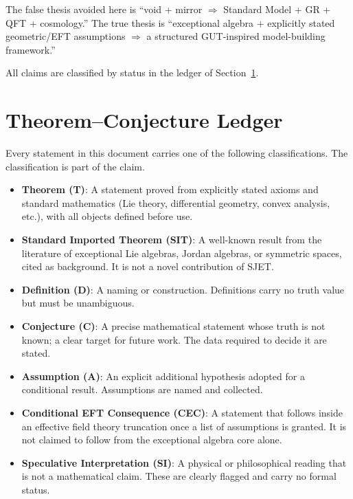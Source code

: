 \documentclass[11pt]{article}
\theoremstyle{plain}
\theoremstyle{definition}
\theoremstyle{remark}
\numberwithin{equation}{section}
\begin{document}
The false thesis avoided here is ``void + mirror $\Longrightarrow$ Standard Model + GR + QFT + cosmology.'' The true thesis is ``exceptional algebra + explicitly stated geometric/EFT assumptions $\Longrightarrow$ a structured GUT-inspired model-building framework.''

All claims are classified by status in the ledger of Section~\ref{sec:ledger}.

\section{Theorem--Conjecture Ledger}
\label{sec:ledger}

Every statement in this document carries one of the following classifications. The classification is part of the claim.

\begin{itemize}[leftmargin=*]
\item \textbf{Theorem (T)}: A statement proved from explicitly stated axioms and standard mathematics (Lie theory, differential geometry, convex analysis, etc.), with all objects defined before use.
\item \textbf{Standard Imported Theorem (SIT)}: A well-known result from the literature of exceptional Lie algebras, Jordan algebras, or symmetric spaces, cited as background. It is not a novel contribution of SJET.
\item \textbf{Definition (D)}: A naming or construction. Definitions carry no truth value but must be unambiguous.
\item \textbf{Conjecture (C)}: A precise mathematical statement whose truth is not known; a clear target for future work. The data required to decide it are stated.
\item \textbf{Assumption (A)}: An explicit additional hypothesis adopted for a conditional result. Assumptions are named and collected.
\item \textbf{Conditional EFT Consequence (CEC)}: A statement that follows inside an effective field theory truncation once a list of assumptions is granted. It is not claimed to follow from the exceptional algebra core alone.
\item \textbf{Speculative Interpretation (SI)}: A physical or philosophical reading that is not a mathematical claim. These are clearly flagged and carry no formal status.
\end{itemize}
\end{document}
